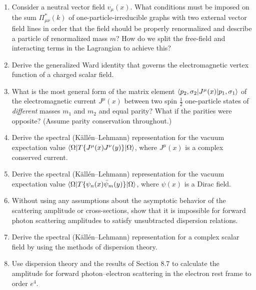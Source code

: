 \begin{enumerate}
\item Consider a neutral vector field $v_\mu(x)$. What conditions must be
imposed on the sum $\Pi^*_{\mu\nu}(k)$ of one-particle-irreducible graphs with
two external vector field lines in order that the field should be properly
renormalized and describe a particle of renormalized mass $m$? How do we split
the free-field and interacting terms in the Lagrangian to achieve this?

\item Derive the generalized Ward identity that governs the electromagnetic
vertex function of a charged scalar field.

\item What is the most general form of the matrix element
$\langle p_2,\sigma_2\rvert J^\mu(x)\lvert p_1,\sigma_1\rangle$ of the electromagnetic current
$J^\mu(x)$ between two spin $\tfrac12$ one-particle states of \emph{different}
masses $m_1$ and $m_2$ and equal parity? What if the parities were opposite?
(Assume parity conservation throughout.)

\item Derive the spectral (K\"all\'en--Lehmann) representation for the vacuum
expectation value $\langle \Omega\rvert T\{J^\mu(x)J^\nu(y)\}\lvert \Omega\rangle$, where
$J^\mu(x)$ is a complex conserved current.

\item Derive the spectral (K\"all\'en--Lehmann) representation for the vacuum
expectation value
$\langle \Omega\rvert T\{\psi_n(x)\bar\psi_m(y)\}\lvert \Omega\rangle$, where $\psi(x)$ is a
Dirac field.

\item Without using any assumptions about the asymptotic behavior of the
scattering amplitude or cross-sections, show that it is impossible for forward
photon scattering amplitudes to satisfy unsubtracted dispersion relations.

\item Derive the spectral (K\"all\'en--Lehmann) representation for a complex
scalar field by using the methods of dispersion theory.

\item Use dispersion theory and the results of Section 8.7 to calculate the
amplitude for forward photon--electron scattering in the electron rest frame
to order $e^4$.
\end{enumerate}


